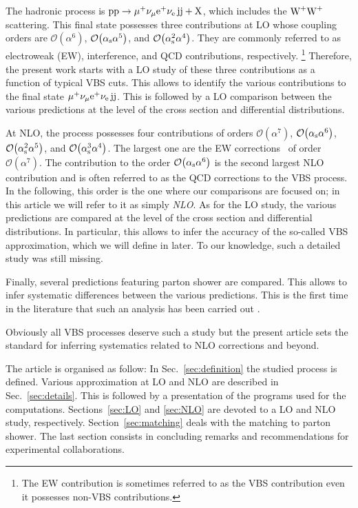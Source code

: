 The hadronic process is $\text{p}\text{p}\to\mu^+\nu_\mu{\rm e}^+\nu_{\rm e}\,\text{j}\text{j}+\mathrm{X}$, which includes the $\text{W}^+\text{W}^+$ scattering.
This final state possesses three contributions at LO whose coupling orders are $\mathcal{O}{\left(\alpha^{6}\right)}$, $\mathcal{O}{\left(\alpha_{\rm s}\alpha^{5}\right)}$, and $\mathcal{O}{\left(\alpha_\text{s}^{2}\alpha^{4}\right)}$.
They are commonly referred to as electroweak (EW), interference, and QCD contributions, respectively.%
\footnote{The EW contribution is sometimes referred to as the VBS contribution even it possesses non-VBS contributions.}
Therefore, the present work starts with a LO study of these three contributions as a function of typical VBS cuts.
This allows to identify the various contributions to the final state $\mu^+\nu_\mu{\rm e}^+\nu_{\rm e}\,\text{j}\text{j}$.
This is followed by a LO comparison between the various predictions at the level of the cross section and differential distributions.

At NLO, the process possesses four contributions of orders $\mathcal{O}{\left(\alpha^{7}\right)}$, $\mathcal{O}{\left(\alpha_\text{s}\alpha^{6}\right)}$, $\mathcal{O}{\left(\alpha_\text{s}^{2}\alpha^{5}\right)}$, and $\mathcal{O}{\left(\alpha_\text{s}^{3}\alpha^{4}\right)}$.
The largest one are the EW corrections~\cite{Biedermann:2017bss,Biedermann:2016yds} of order $\mathcal{O}{\left(\alpha^{7}\right)}$.
The contribution to the order $\mathcal{O}{\left(\alpha_\text{s}\alpha^{6}\right)}$ is the second largest NLO contribution and is often referred to as the QCD corrections to the VBS process.
In the following, this order is the one where our comparisons are focused on; in this article we will refer to it as simply \emph{NLO}.
As for the LO study, the various predictions are compared at the level of the cross section and differential distributions.
In particular, this allows to infer the accuracy of the so-called VBS approximation, which we will define in later.
To our knowledge, such a detailed study was still missing.

Finally, several predictions featuring parton shower are compared.
This allows to infer systematic differences between the various predictions.
This is the first time in the literature that such an analysis has been carried out .

Obviously all VBS processes deserve such a study but the present article sets the standard for inferring systematics related to NLO corrections and beyond.


The article is organised as follow:
In Sec.~\ref{sec:definition} the studied process is defined.
Various approximation at LO and NLO are described in Sec.~\ref{sec:details}.
This is followed by a presentation of the programs used for the computations.
Sections~\ref{sec:LO} and \ref{sec:NLO} are devoted to a LO and NLO study, respectively.
Section~\ref{sec:matching} deals with the matching to parton shower.
The last section consists in concluding remarks and recommendations for experimental collaborations.
